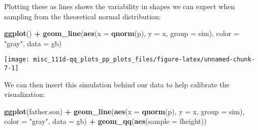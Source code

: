 \documentclass[]{book}
\newenvironment{Shaded}{\begin{snugshade}}{\end{snugshade}}
\newcommand{\CommentTok}[1]{\textcolor[rgb]{0.56,0.35,0.01}{\textit{#1}}}
\newcommand{\DataTypeTok}[1]{\textcolor[rgb]{0.13,0.29,0.53}{#1}}
\newcommand{\DecValTok}[1]{\textcolor[rgb]{0.00,0.00,0.81}{#1}}
\newcommand{\KeywordTok}[1]{\textcolor[rgb]{0.13,0.29,0.53}{\textbf{#1}}}
\newcommand{\NormalTok}[1]{#1}
\newcommand{\OperatorTok}[1]{\textcolor[rgb]{0.81,0.36,0.00}{\textbf{#1}}}
\newcommand{\StringTok}[1]{\textcolor[rgb]{0.31,0.60,0.02}{#1}}
\begin{document}
Plotting these as lines shows the variability in shapes we can expect when sampling from the theoretical normal distribution:

\begin{Shaded}
\end{Shaded}

\begin{Shaded}
\begin{Highlighting}[]
\KeywordTok{ggplot}\NormalTok{() }\OperatorTok{+}
\StringTok{    }\KeywordTok{geom_line}\NormalTok{(}\KeywordTok{aes}\NormalTok{(}\DataTypeTok{x =} \KeywordTok{qnorm}\NormalTok{(p), }\DataTypeTok{y =}\NormalTok{ x, }\DataTypeTok{group =}\NormalTok{ sim),}
              \DataTypeTok{color =} \StringTok{"gray"}\NormalTok{, }\DataTypeTok{data =}\NormalTok{ gb)}
\end{Highlighting}
\end{Shaded}

\begin{center}\texttt{[image: misc\_111d-qq\_plots\_pp\_plots\_files/figure-latex/unnamed-chunk-7-1]} \end{center}

We can then insert this simulation behind our data to help calibrate the visualization:

\begin{Shaded}
\begin{Highlighting}[]
\KeywordTok{ggplot}\NormalTok{(father.son) }\OperatorTok{+}
\StringTok{    }\KeywordTok{geom_line}\NormalTok{(}\KeywordTok{aes}\NormalTok{(}\DataTypeTok{x =} \KeywordTok{qnorm}\NormalTok{(p), }\DataTypeTok{y =}\NormalTok{ x, }\DataTypeTok{group =}\NormalTok{ sim),}
              \DataTypeTok{color =} \StringTok{"gray"}\NormalTok{, }\DataTypeTok{data =}\NormalTok{ gb) }\OperatorTok{+}
\StringTok{    }\KeywordTok{geom_qq}\NormalTok{(}\KeywordTok{aes}\NormalTok{(}\DataTypeTok{sample =}\NormalTok{ fheight))}
\end{Highlighting}
\end{Shaded}
\end{document}
